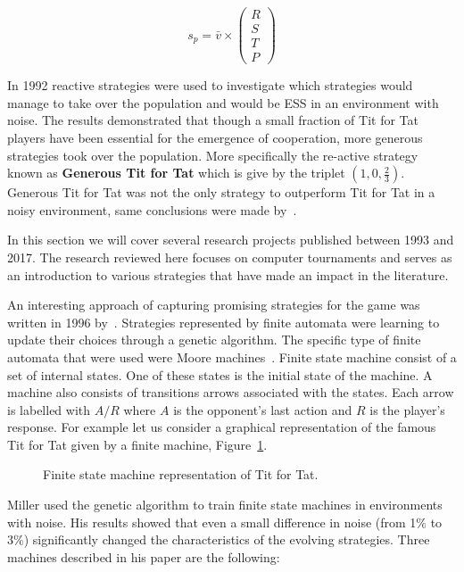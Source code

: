 \documentclass{article}
\theoremstyle{definition}
\begin{document}
\[s_p = \bar{v} \times \begin{pmatrix} R \\ S \\ T \\ P \end{pmatrix}\]

In 1992 reactive strategies were used
to investigate which strategies would manage to take over
the population and would be ESS in an environment with noise. The results demonstrated that 
though a small fraction of Tit for Tat players have been essential for the emergence
of cooperation, more generous strategies took over the population. More specifically
the re-active strategy known as \textbf{Generous Tit for Tat} which is give by
the triplet \((1, 0, \frac{2}{3})\). Generous Tit for Tat was not the only strategy
to outperform Tit for Tat in a noisy environment, same conclusions were made
by~\cite{Godfray1992, Bendor1991}.

In this section we will cover several
research projects published between 1993 and 2017. The research reviewed here focuses
on computer tournaments and serves as an introduction to various strategies that
have made an impact in the literature.

An interesting approach of capturing promising strategies for the game
was written in 1996 by~\cite{Miller1996}. Strategies represented by finite automata
were learning to update their choices through a genetic algorithm.
The specific type of finite automata that were used were Moore machines~\cite{moore1956}.
Finite state machine consist of a set of internal states. One of these states
is the initial state of the machine. A machine also consists of transitions
arrows associated with the states. Each arrow is labelled with \(A/R\) where
\(A\) is the opponent's last action and \(R\) is the player's response.
For example let us consider a graphical representation of the famous Tit for Tat
given by a finite machine, Figure~\ref{fig:tit_for_tat_fsm}.

\begin{figure}[!hbtp]
    \centering
    
    \caption{Finite state machine representation of Tit for Tat.}
    \label{fig:tit_for_tat_fsm}
\end{figure}

Miller used the genetic algorithm to train finite state machines in
environments with noise. His results showed that even a small difference in noise
(from 1\% to 3\%) significantly changed the characteristics of the
evolving strategies. Three machines described in his paper are the following:
\end{document}
